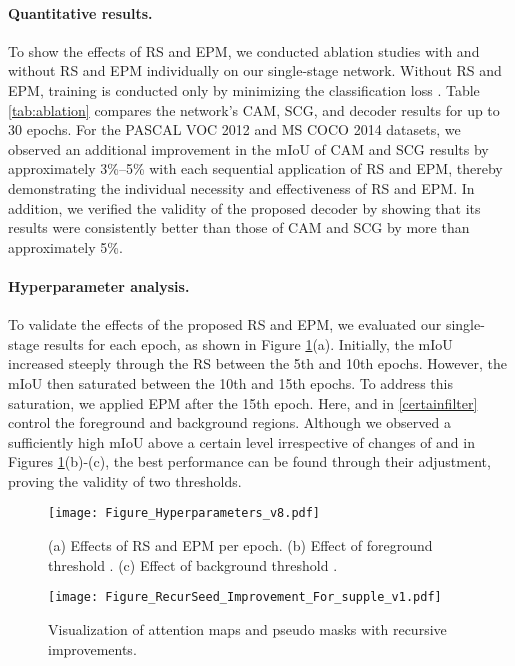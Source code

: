 \documentclass[11pt]{article}
\begin{document}
\paragraph{Quantitative results.}
To show the effects of RS and EPM, we conducted ablation studies with and without RS and EPM individually on our single-stage network. Without RS and EPM, training is conducted only by minimizing the classification loss . 
Table \ref{tab:ablation} compares the network's CAM, SCG, and decoder results for up to 30 epochs. For the PASCAL VOC 2012 and MS COCO 2014 datasets, we observed an additional improvement in the mIoU of CAM and SCG results by approximately 3\%--5\% with each sequential application of RS and EPM, thereby demonstrating the individual necessity and effectiveness of RS and EPM. In addition, we verified the validity of the proposed decoder by showing that its results were consistently better than those of CAM and SCG by more than approximately 5\%.

\paragraph{Hyperparameter analysis.}
To validate the effects of the proposed RS and EPM, we evaluated our single-stage results for each epoch, as shown in Figure \ref{fig:training}(a). Initially, the mIoU increased steeply through the RS between the 5th and 10th epochs. However, the mIoU then saturated between the 10th and 15th epochs. To address this saturation, we applied EPM after the 15th epoch. Here,  and  in \eqref{certainfilter} control the foreground and background regions. Although we observed a sufficiently high mIoU above a certain level irrespective of changes of  and  in Figures \ref{fig:training}(b)-(c), the best performance can be found through their adjustment, proving the validity of two thresholds.



\begin{figure}[t]\centering 
    \texttt{[image: Figure\_Hyperparameters\_v8.pdf]}
    \caption{
        (a) Effects of RS and EPM per epoch.
        (b) Effect of foreground threshold .
        (c) Effect of background threshold .
    }
    \label{fig:training}
\end{figure}

\begin{figure}[t]\centering \texttt{[image: Figure\_RecurSeed\_Improvement\_For\_supple\_v1.pdf]}
    \caption{
        Visualization of attention maps and pseudo masks with recursive improvements.
    }
    \label{fig:impro}
\end{figure}
\end{document}
